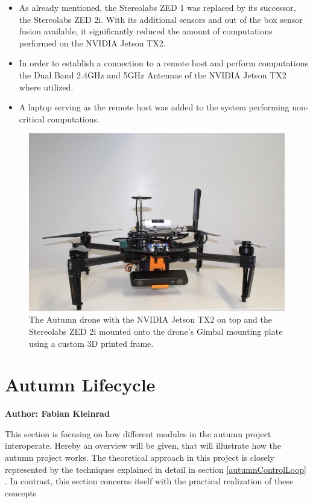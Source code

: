 \begin{itemize}
	\item As already mentioned, the Stereolabs ZED 1 was replaced by its successor, the Stereolabs ZED 2i. With its additional sensors and out of the box sensor fusion available, it significantly reduced the amount of computations performed on the NVIDIA Jetson TX2. 
	\item In order to establish a connection to a remote host and perform computations the Dual Band 2.4GHz and 5GHz Antennas of the NVIDIA Jetson TX2 where utilized. 
	\item A laptop serving as the remote host was added to the system performing non-critical computations.
\end{itemize}

\begin{figure}
	\centering
	\includegraphics[width=0.9\linewidth]{img/autumnDrone}
	\caption{
		The Autumn drone with the NVIDIA Jetson TX2 on top and the Stereolabs ZED 2i mounted onto the drone's Gimbal mounting plate using a custom 3D printed frame. 
	}
	\label{fig:autumn}
\end{figure}


\section{Autumn Lifecycle}
\textbf{Author: Fabian Kleinrad} 

This section is focusing on how different modules in the autumn project interoperate. Hereby an overview will be given, that will illustrate how the autumn project works. The theoretical approach in this project is closely represented by the techniques explained in detail in section 
\ref{autumnControlLoop}
. In contrast, this section concerns itself with the practical realization of these concepts

